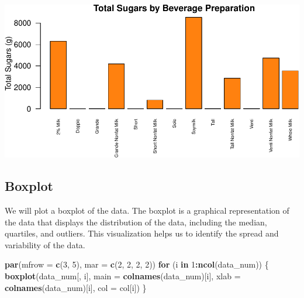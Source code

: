 \documentclass[
]{article}
\newenvironment{Shaded}{\begin{snugshade}}{\end{snugshade}}
\newcommand{\AttributeTok}[1]{\textcolor[rgb]{0.13,0.29,0.53}{#1}}
\newcommand{\ControlFlowTok}[1]{\textcolor[rgb]{0.13,0.29,0.53}{\textbf{#1}}}
\newcommand{\DecValTok}[1]{\textcolor[rgb]{0.00,0.00,0.81}{#1}}
\newcommand{\FunctionTok}[1]{\textcolor[rgb]{0.13,0.29,0.53}{\textbf{#1}}}
\newcommand{\NormalTok}[1]{#1}
\newcommand{\SpecialCharTok}[1]{\textcolor[rgb]{0.81,0.36,0.00}{\textbf{#1}}}
\begin{document}
\begin{center}\includegraphics{Statistical_Learning_Final_Report_files/figure-latex/total_sugars-1} \end{center}

\subsection{Boxplot}\label{boxplot}

We will plot a boxplot of the data. The boxplot is a graphical
representation of the data that displays the distribution of the data,
including the median, quartiles, and outliers. This visualization helps
us to identify the spread and variability of the data.

\begin{Shaded}
\begin{Highlighting}[]
\FunctionTok{par}\NormalTok{(}\AttributeTok{mfrow =} \FunctionTok{c}\NormalTok{(}\DecValTok{3}\NormalTok{, }\DecValTok{5}\NormalTok{), }\AttributeTok{mar =} \FunctionTok{c}\NormalTok{(}\DecValTok{2}\NormalTok{, }\DecValTok{2}\NormalTok{, }\DecValTok{2}\NormalTok{, }\DecValTok{2}\NormalTok{))}
\ControlFlowTok{for}\NormalTok{ (i }\ControlFlowTok{in} \DecValTok{1}\SpecialCharTok{:}\FunctionTok{ncol}\NormalTok{(data\_num)) \{}
  \FunctionTok{boxplot}\NormalTok{(data\_num[, i], }\AttributeTok{main =} \FunctionTok{colnames}\NormalTok{(data\_num)[i],}
          \AttributeTok{xlab =} \FunctionTok{colnames}\NormalTok{(data\_num)[i], }\AttributeTok{col =}\NormalTok{ col[i])}
\NormalTok{\}}
\end{Highlighting}
\end{Shaded}
\end{document}
